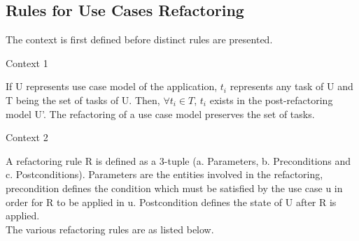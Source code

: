 \subsection{Rules for Use Cases Refactoring}\label{section:selection_by_use_case/rules_for_use_case_refactoring}
The context is first defined before distinct rules are presented.
\\
\begin{shaded}Context 1 \end{shaded}
If U represents use case model of the application, $t_i$ represents any task of U and T being the set of tasks of U. Then, $\forall t_i \in T $, $t_i$ exists in the post-refactoring model U'. The refactoring of a use case model preserves the set of tasks.
\\
\begin{shaded}Context 2 \end{shaded}
A refactoring rule R is defined as a 3-tuple (a. Parameters, b. Preconditions and c. Postconditions). Parameters are the entities involved in the refactoring, precondition defines the condition which must be satisfied by the use case u in order for R to be applied in u. Postcondition defines the state of U after R is applied.
\\
The various refactoring rules are as listed below.
\\
